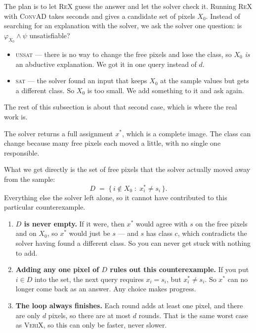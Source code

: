 \documentclass[11pt,a4paper]{article}
\newcommand{\rex}{\textsc{ReX}}
\newcommand{\convad}{\textsc{ConvAD}}
\newcommand{\verix}{\textsc{VeriX}}
\begin{document}
The plan is to let \rex{} guess the answer and let the solver check it. Running
\rex{} with \convad{} takes seconds and gives a candidate set of pixels $X_0$.
Instead of searching for an explanation with the solver, we ask the solver one
question: is $\varphi_{X_0} \wedge \psi$ unsatisfiable?

\begin{itemize}[leftmargin=1.2em]
\item \textsc{unsat} --- there is no way to change the free pixels and lose the
class, so $X_0$ \emph{is} an abductive explanation. We got it in one query
instead of $d$.
\item \textsc{sat} --- the solver found an input that keeps $X_0$ at the sample
values but gets a different class. So $X_0$ is too small. We add something to it
and ask again.
\end{itemize}

\noindent
The rest of this subsection is about that second case, which is where the real
work is.


The solver returns a full assignment $x^\ast$, which is a complete image. 
The
class can change because many free pixels each moved a little, with no single
one responsible.

What we get directly is the set of free pixels that the solver actually
moved away from the sample:
\[
D \;=\; \{\, i \notin X_0 \;:\; x^\ast_i \neq s_i \,\}.
\]
Everything else the solver left alone, so it cannot have contributed to this
particular counterexample.


\begin{enumerate}[leftmargin=1.4em,label=\arabic*.]
\item \textbf{$D$ is never empty.} If it were, then $x^\ast$ would agree with
$s$ on the free pixels and on $X_0$, so $x^\ast$ would just be $s$ --- and $s$
has class $c$, which contradicts the solver having found a different class.
So you can never get stuck with nothing to add.

\item \textbf{Adding any one pixel of $D$ rules out this counterexample.} If you
put $i \in D$ into the set, the next query requires $x_i = s_i$, but
$x^\ast_i \neq s_i$. So $x^\ast$ can no longer come back as an answer. Any
choice makes progress.

\item \textbf{The loop always finishes.} Each round adds at least one pixel, and
there are only $d$ pixels, so there are at most $d$ rounds. That is the same
worst case as \verix{}, so this can only be faster, never slower.
\end{enumerate}
\end{document}
